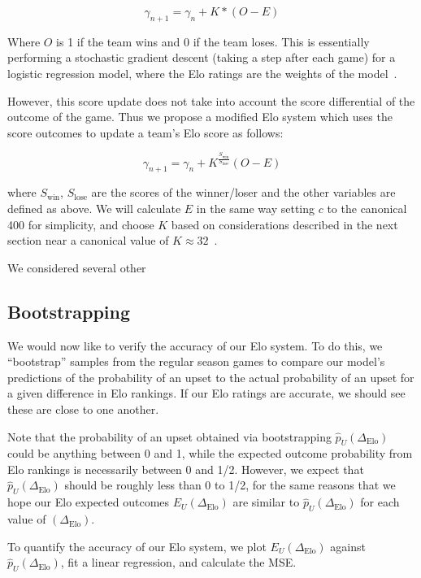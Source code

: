 \documentclass{article}
\begin{document}
\[
\gamma_{n+1} = \gamma_n + K*(O - E)\]

Where $O$ is 1 if the team wins and 0 if the team loses. This is essentially performing a stochastic gradient descent (taking a step after each game) for a logistic regression model, where the Elo ratings are the weights of the model~\cite{stmorseStatisticalLearning}.

However, this score update does not take into account the score differential of the outcome of the game. Thus we propose a modified Elo system which uses the score outcomes to update a team's Elo score as follows: 

\[
\gamma_{n+1} = \gamma_n + K^{\frac{S_{\text{win}}}{S_{\text{lose}}}}(O - E)
\]

where $S_{\text{win}}$, $S_{\text{lose}}$ are the scores of the winner/loser and the other variables are defined as above. We will calculate $E$ in the same way setting $c$ to the canonical 400 for simplicity, and choose $K$ based on considerations described in the next section near a canonical value  of $K\approx 32$~\cite{mediumRatingSystem}.

We considered several other 




\subsection{Bootstrapping}
We would now like to verify the accuracy of our Elo system. To do this, we ``bootstrap'' \cite{builtinWhatBootstrapping} samples from the regular season games to compare our model's predictions of the probability of an upset to the actual probability of an upset for a given difference in Elo rankings. If our Elo ratings are accurate, we should see these are close to one another.

Note that the probability of an upset obtained via bootstrapping $\hat{p}_U(\Delta_{\text{Elo}})$ could be anything between 0 and 1, while the expected outcome probability from Elo rankings is necessarily between 0 and 1/2. However, we expect that $\hat{p}_U(\Delta_{\text{Elo}})$ should be roughly less than 0 to 1/2, for the same reasons that we hope our Elo expected outcomes $E_U(\Delta_{\text{Elo}})$ are similar to $\hat{p}_U(\Delta_{\text{Elo}})$ for each value of $(\Delta_{\text{Elo}})$. 


To quantify the accuracy of our Elo system, we plot $E_U(\Delta_{\text{Elo}})$ against $\hat{p}_U(\Delta_{\text{Elo}})$, fit a linear regression, and calculate the MSE.  
\end{document}

